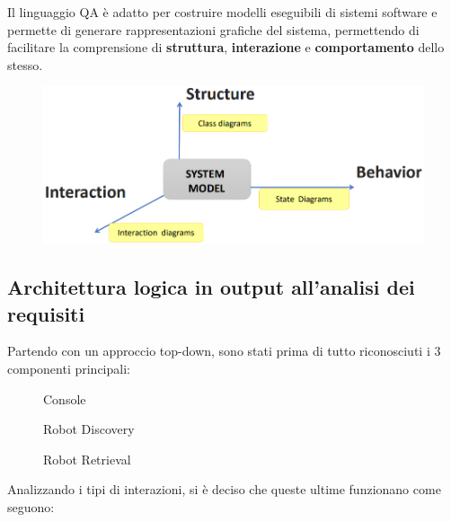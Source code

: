 Il linguaggio QA è adatto per costruire modelli eseguibili di sistemi software e permette di generare rappresentazioni grafiche del sistema,
permettendo di facilitare la comprensione di \textbf{struttura}, \textbf{interazione} e \textbf{comportamento} dello stesso.

\begin{figure}[H]
  \centering
  \includegraphics[width=1\textwidth]{res/logicalArchitecture.png}%
  \label{fig:logicalArchitecture}
\end{figure}

\subsection{Architettura logica in output all'analisi dei requisiti}

Partendo con un approccio top-down, sono stati prima di tutto riconosciuti i 3 componenti principali:

\begin{figure}[H]
  \centering
  \caption{Console}%
  \label{fig:sp1:req:console}
\end{figure}

\begin{figure}[H]
  \centering
  \caption{Robot Discovery}%
  \label{fig:sp1:req:robotdiscovery}
\end{figure}

\begin{figure}[H]
  \centering
  \caption{Robot Retrieval}%
  \label{fig:sp1:req:robotretrieval}
\end{figure}

Analizzando i tipi di interazioni, si è deciso che queste ultime funzionano come seguono:

